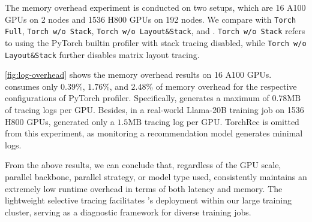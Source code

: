 The memory overhead experiment is conducted on two setups, which are 16 A100 GPUs on 2 nodes and 1536 H800 GPUs on 192 nodes. We compare \sysname{} with \texttt{Torch Full}, \texttt{Torch w/o Stack}, \texttt{Torch w/o Layout\&Stack}, and \sysname{}. \texttt{Torch w/o Stack} refers to using the PyTorch builtin profiler with stack tracing disabled, while \texttt{Torch w/o Layout\&Stack} further disables matrix layout tracing.

\autoref{fig:log-overhead} shows the memory overhead results on 16 A100 GPUs. \sysname{} consumes only $0.39\%$, $1.76\%$, and $2.48\%$ of memory overhead for the respective configurations of PyTorch profiler. Specifically, \sysname{} generates a maximum of $0.78\text{MB}$ of tracing logs per GPU. Besides, in a real-world Llama-20B training job on 1536 H800 GPUs, \sysname{} generated only a $1.5\text{MB}$ tracing log per GPU.
TorchRec is omitted from this experiment, as monitoring a recommendation model generates minimal logs.

From the above results, we can conclude that, regardless of the GPU scale, parallel backbone, parallel strategy, or model type used, \sysname{} consistently maintains an extremely low runtime overhead in terms of both latency and memory. The lightweight selective tracing facilitates \sysname{}'s deployment within our large training cluster, serving as a diagnostic framework for diverse training jobs.




